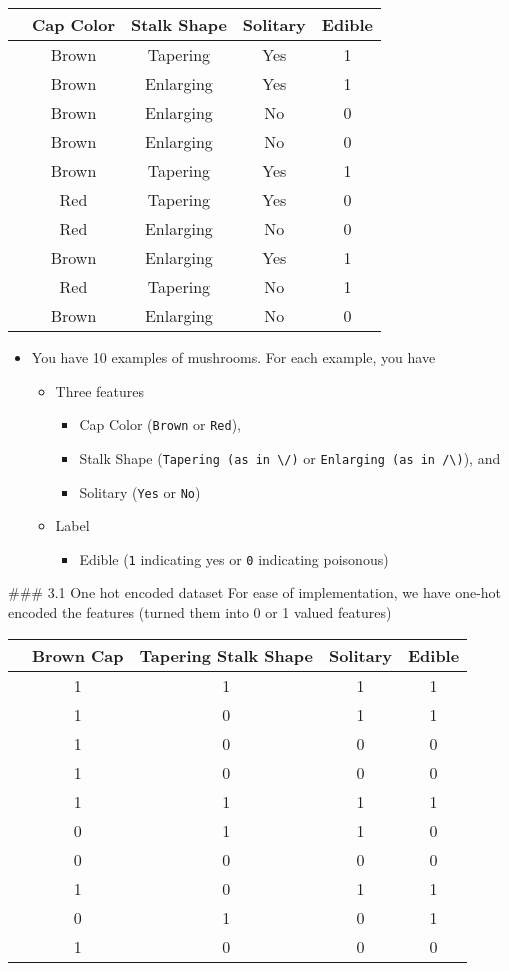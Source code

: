 \documentclass[11pt]{article}
\providecommand{\tightlist}{%
      \setlength{\itemsep}{0pt}\setlength{\parskip}{0pt}}
\begin{document}
\begin{longtable}[]{@{}ccccc@{}}
\toprule
& Cap Color & Stalk Shape & Solitary & Edible\tabularnewline
\midrule
\endhead
& Brown & Tapering & Yes & 1\tabularnewline
& Brown & Enlarging & Yes & 1\tabularnewline
& Brown & Enlarging & No & 0\tabularnewline
& Brown & Enlarging & No & 0\tabularnewline
& Brown & Tapering & Yes & 1\tabularnewline
& Red & Tapering & Yes & 0\tabularnewline
& Red & Enlarging & No & 0\tabularnewline
& Brown & Enlarging & Yes & 1\tabularnewline
& Red & Tapering & No & 1\tabularnewline
& Brown & Enlarging & No & 0\tabularnewline
\bottomrule
\end{longtable}

\begin{itemize}
\tightlist
\item
  You have 10 examples of mushrooms. For each example, you have

  \begin{itemize}
  \tightlist
  \item
    Three features

    \begin{itemize}
    \tightlist
    \item
      Cap Color (\texttt{Brown} or \texttt{Red}),
    \item
      Stalk Shape (\texttt{Tapering\ (as\ in\ \textbackslash{}/)} or
      \texttt{Enlarging\ (as\ in\ /\textbackslash{})}), and
    \item
      Solitary (\texttt{Yes} or \texttt{No})
    \end{itemize}
  \item
    Label

    \begin{itemize}
    \tightlist
    \item
      Edible (\texttt{1} indicating yes or \texttt{0} indicating
      poisonous)
    \end{itemize}
  \end{itemize}
\end{itemize}

\#\#\# 3.1 One hot encoded dataset For ease of implementation, we have
one-hot encoded the features (turned them into 0 or 1 valued features)

\begin{longtable}[]{@{}ccccc@{}}
\toprule
& Brown Cap & Tapering Stalk Shape & Solitary & Edible\tabularnewline
\midrule
\endhead
& 1 & 1 & 1 & 1\tabularnewline
& 1 & 0 & 1 & 1\tabularnewline
& 1 & 0 & 0 & 0\tabularnewline
& 1 & 0 & 0 & 0\tabularnewline
& 1 & 1 & 1 & 1\tabularnewline
& 0 & 1 & 1 & 0\tabularnewline
& 0 & 0 & 0 & 0\tabularnewline
& 1 & 0 & 1 & 1\tabularnewline
& 0 & 1 & 0 & 1\tabularnewline
& 1 & 0 & 0 & 0\tabularnewline
\bottomrule
\end{longtable}
\end{document}
